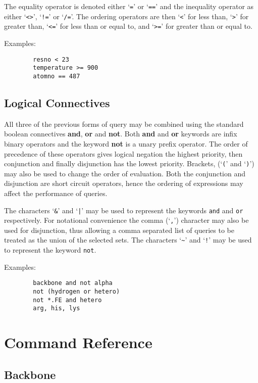 The equality operator is denoted either `\verb"="' or `\verb"=="' and 
the inequality operator as either `\verb"<>"', `\verb"!="' or `\verb"/="'. 
The ordering operators are then `\verb"<"' for less than, `\verb">"' for 
greater than, `\verb"<="' for less than or equal to, and `\verb">="' for 
greater than or equal to.


Examples:
\begin{verbatim}
        resno < 23
        temperature >= 900
        atomno == 487
\end{verbatim}


\subsection{Logical Connectives}
\label{Logical}
All three of the previous forms of query may be combined using the standard
boolean connectives {\bf and}, {\bf or} and {\bf not}. Both {\bf and} and
{\bf or} keywords are infix binary operators and the keyword {\bf not} is
a unary prefix operator. The order of precedence of these operators gives
logical negation the highest priority, then conjunction and finally 
disjunction has the lowest priority. Brackets, (`{\tt (}' and `{\tt )}') 
may also be used to change the order of evaluation. Both the conjunction 
and disjunction are short circuit operators, hence the ordering of 
expressions may affect the performance of queries.

The characters `{\tt \&}' and `{\tt |}' may be used to represent the
keywords {\tt and} and {\tt or} respectively. For notational convenience
the comma (`{\tt ,}') character may also be used for disjunction, thus
allowing a comma separated list of queries to be treated as the union of
the selected sets. The characters `\verb"~"' and `\verb"!"' may be used
to represent the keyword {\tt not}.

Examples:
\begin{verbatim}
        backbone and not alpha
        not (hydrogen or hetero)
        not *.FE and hetero
        arg, his, lys
\end{verbatim}


\section{Command Reference}
\label{Reference}

\subsection{Backbone}
\label{CBackbone}

